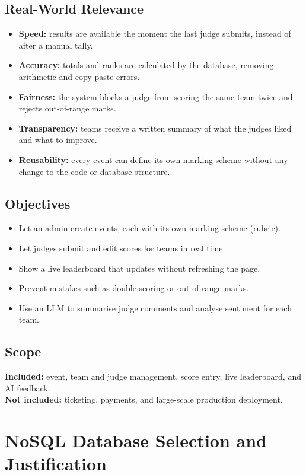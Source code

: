 \documentclass[11pt,a4paper]{article}
\begin{document}
\subsection{Real-World Relevance}
\begin{itemize}
  \item \textbf{Speed:} results are available the moment the last judge submits, instead of after a manual tally.
  \item \textbf{Accuracy:} totals and ranks are calculated by the database, removing arithmetic and copy-paste errors.
  \item \textbf{Fairness:} the system blocks a judge from scoring the same team twice and rejects out-of-range marks.
  \item \textbf{Transparency:} teams receive a written summary of what the judges liked and what to improve.
  \item \textbf{Reusability:} every event can define its own marking scheme without any change to the code or database structure.
\end{itemize}

\subsection{Objectives}
\begin{itemize}
  \item Let an admin create events, each with its own marking scheme (rubric).
  \item Let judges submit and edit scores for teams in real time.
  \item Show a live leaderboard that updates without refreshing the page.
  \item Prevent mistakes such as double scoring or out-of-range marks.
  \item Use an LLM to summarise judge comments and analyse sentiment for each team.
\end{itemize}

\subsection{Scope}
\textbf{Included:} event, team and judge management, score entry, live leaderboard, and AI feedback.\\
\textbf{Not included:} ticketing, payments, and large-scale production deployment.

\section{NoSQL Database Selection and Justification}
\end{document}
